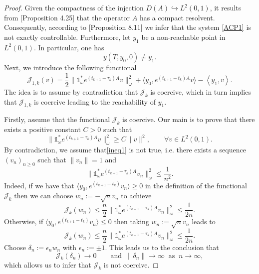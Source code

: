 \documentclass[sn-mathphys]{sn-jnl}
\begin{document}
\begin{proof}
    Given the compactness of the injection \(D(A) \hookrightarrow L^2(0,1)\), it results from [Proposition 4.25] that the operator $A$ has a compact resolvent. Consequently, according to [Proposition 8.11] we infer that the system \eqref{ACP1} is not exactly controllable. Furthermore, let $y_1$ be a non-reachable point in $L^2(0,1)$. In particular, one has \[y(T,y_0,0) \neq y_1.\]
    Next, we introduce the following functional 
    \[\mathcal{J}_{1,k}(v)= \dfrac{1}{2}\|\mathds{1}_{\omega}^*e^{(t_{k+1}-\tau_k)A}v\|_{\omega}^2+\langle y_0,e^{(t_{k+1}-t_k)A}v\rangle - \left\langle y_1 , v \right\rangle.\]
    The idea is to assume by contradiction that $\mathcal{J}_k$ is coercive, which in turn implies that $\mathcal{J}_{1,k}$ is coercive leading to the reachability of $y_1$.
    
    Firstly, assume that the functional $\mathcal{J}_k$ is coercive. Our main is to prove that there exists a positive constant $C>0$ such that
    \begin{equation}\label{ineq1}
        \|\mathds{1}_{\omega}^{*} e^{(t_{k+1}-\tau_k) A} v \|_{\omega}^2 \geq C \|v\|^2, \qquad \forall v \in L^2(0,1).
    \end{equation}
    By contradiction, we assume that\eqref{ineq1} is not true, i.e. there exists a sequence $(v_n)_{n \geq 0}$ such that $\|v_n\|=1$ and 
    \[\|\mathds{1}_{\omega}^{*} e^{(t_{k+1}-\tau_k) A} v_n \|_{\omega}^2 \leq \dfrac{1}{n^2}.\]
    Indeed, if we have that \(\langle y_0,e^{(t_{k+1}-t_k)}v_n\rangle \geq 0\) in the definition of the functional \(\mathcal{J}_k\) then we can choose \(w_n := -\sqrt{n} v_n\) to achieve
    \[\mathcal{J}_k(w_n) \leq \dfrac{n}{2}\|\mathds{1}_{\omega}^*e^{(t_{k+1}-\tau_k)A}v_n\|_{\omega}^2 \leq \dfrac{1}{2n}.\]
    Otherwise, if \(\langle y_0,e^{(t_{k+1}-t_k)}v_n\rangle \leq 0\) then taking $w_n:= \sqrt{n} v_n$ leads to
    \[\mathcal{J}_k(w_n) \leq \dfrac{n}{2}\|\mathds{1}_{\omega}^*e^{(t_{k+1}-\tau_k)A}v_n\|_{\omega}^2 \leq \dfrac{1}{2n}.\]
    Choose $\delta_n :=\epsilon_n w_n$ with $\epsilon_n := \pm 1$. This leads us to the conclusion that
    \[\mathcal{J}_k(\delta_n) \rightarrow 0 \qquad \text{and}\;\; \|\delta_n\| \rightarrow \infty \;\;\text{as}\;\; n \to \infty,\]
    which allows us to infer that \(\mathcal{J}_k\) is not coercive.
    

\end{proof}
\end{document}
